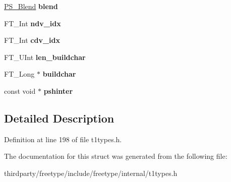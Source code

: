 \begin{DoxyCompactItemize}
\hyperlink{struct_p_s___blend_rec__}{P\+S\+\_\+\+Blend} {\bfseries blend}
\item 
\mbox{\label{struct_t1___face_rec___a0ecadea7618642ccc351f81ac56ec266}} 
F\+T\+\_\+\+Int {\bfseries ndv\+\_\+idx}
\item 
\mbox{\label{struct_t1___face_rec___a7a77dcddf65ac6d86f1f62b3859d11d8}} 
F\+T\+\_\+\+Int {\bfseries cdv\+\_\+idx}
\item 
\mbox{\label{struct_t1___face_rec___a75554021d0baddb1c64f69fd8dbde86b}} 
F\+T\+\_\+\+U\+Int {\bfseries len\+\_\+buildchar}
\item 
\mbox{\label{struct_t1___face_rec___af1fd890acaa0f423f7cc36807c42d75f}} 
F\+T\+\_\+\+Long $\ast$ {\bfseries buildchar}
\item 
\mbox{\label{struct_t1___face_rec___a438e8ce8cbd53b7e205b17f95e7b2106}} 
const void $\ast$ {\bfseries pshinter}
\end{DoxyCompactItemize}


\subsection{Detailed Description}


Definition at line 198 of file t1types.\+h.



The documentation for this struct was generated from the following file\+:\begin{DoxyCompactItemize}
\item 
thirdparty/freetype/include/freetype/internal/t1types.\+h\end{DoxyCompactItemize}
